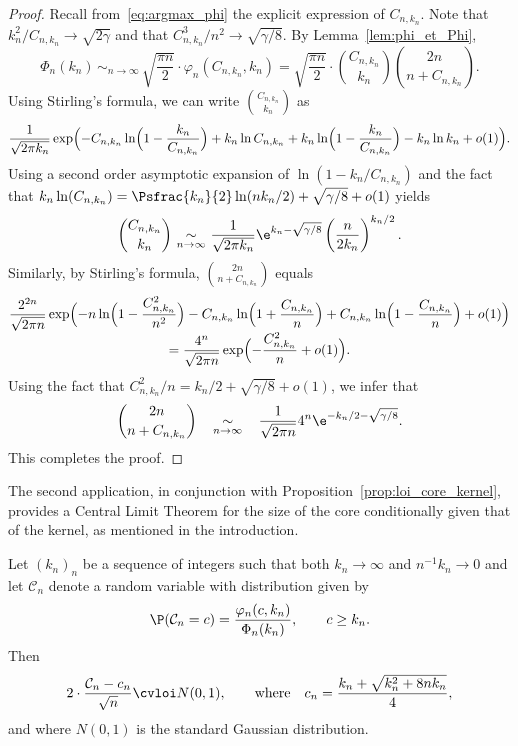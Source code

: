 \begin{proof}
Recall from~\eqref{eq:argmax_phi} the explicit expression of $C_{n,k_{n}}$. Note that $k_{n}^{2}/C_{n,k_{n}} \rightarrow \sqrt{2 \gamma}$ and that $C_{n,k_n}^{3}/n^{2} \rightarrow \sqrt{\gamma/8}$. By Lemma~\ref{lem:phi_et_Phi},\vspace*{-3pt}
\[
\Phi_{n}(k_{n}) \, \mathop{\sim}_{n \rightarrow \infty} \, \sqrt{ \frac{\pi n}{2}} \cdot \varphi_{n}(C_{n,k_n},k_n)= \sqrt{ \frac{\pi n}{2}} \cdot \binom{C_{n,k_{n}}}{k_{n}} \binom{2n}{n+C_{n,k_{n}}}.
\]
Using Stirling's formula, we can write $ \binom{C_{n,k_{n}}}{k_{n}}$ as\vspace*{-3pt}
\[
\frac{1}{\sqrt{2 \pi k_{n}}} \exp \Bigl(-C_{n,k_n} \ln \Bigl(1- \frac{k_{n}}{C_{n,k_n}}\Bigr)+ k_{n} \ln C_{n,k_n}+ k_{n} \ln \Bigl(1- \frac{k_{n}}{C_{n,k_n}}\Bigr)-k_{n} \ln k_{n} +o(1) \Bigr).
\]
Using a second order asymptotic expansion of $\ln(1-k_{n}/C_{n,k_n})$ and the fact that $k_{n }\ln(C_{n,k_{n}})= \Psfrac{k_{n}}{2} \ln(n k_{n}/2)+\sqrt{\gamma/8}+o(1)$ yields\vspace*{-3pt}
\[
\binom{C_{n,k_{n}}}{k_{n}} \, \mathop{\sim}_{n \rightarrow \infty} \, \frac{1}{\sqrt{2 \pi k_{n}}} \e^{k_{n}-\sqrt{\gamma/8}} \left(\frac{n}{2 k_{n}}\right)^{k_{n}/2}.
\]
Similarly, by Stirling's formula,
$\binom{2n}{n+C_{n,k_{n}}}$ equals\vspace*{-5pt}
\begin{multline*}
\frac{2^{2n}}{\sqrt{ 2 \pi n}} \exp \Bigl(-n \ln \Bigl(1- \frac{C_{n,k_n}^{2}}{n^{2}} \Bigr)-C_{n,k_n}\ln \Bigl(1+ \frac{C_{n,k_n}}{n} \Bigr) + C_{n,k_n}\ln \Bigl(1- \frac{C_{n,k_n}}{n}\Bigr)+o(1)\Bigr)
\\[-3pt]
= \frac{4^n}{\sqrt{ 2 \pi n}} \exp \Bigl(- \frac{C_{n,k_n}^{2}}{n}+o(1) \Bigr).
\end{multline*}
Using the fact that $C_{n,k_n}^{2}/n=k_{n}/2+ \sqrt{\gamma/8}+o(1)$, we infer that
\[
\binom{2n}{n+C_{n,k_{n}}} \quad \mathop{\sim}_{n \rightarrow \infty} \quad \frac{1}{\sqrt{ 2 \pi n}} 4^{n} \e^{-k_{n}/2-\sqrt{\gamma/8}}.
\]
This completes the proof.
\end{proof}

The second application, in conjunction with Proposition~\ref{prop:loi_core_kernel}, provides a Central Limit Theorem for the size of the core conditionally given that of the kernel, as mentioned in the introduction.

\begin{corollary}\label{cor:TCL_core}
Let $(k_n)_n$ be a sequence of integers such that both $k_n \to \infty$ and $n^{-1} k_n\to0$ and let $\mathcal{C}_{n}$ denote a random variable with distribution given by\vspace*{-3pt}
\[
\P(\mathcal{C}_{n}=c)= \frac{\varphi_{n}(c,k_{n})}{ \Phi_{n}(k_{n})}, \qquad c \geq k_{n}.
\]
Then\vspace*{-3pt}
\[
2 \cdot \frac{ \mathcal{C}_{n}-c_n}{ \sqrt{n}} \cvloi N(0,1),
\qquad\text{where}\quad
c_n = \frac{k_n + \sqrt{k_n^{2} + 8 n k_n }}{4} ,
\]
and where $N(0,1)$ is the standard Gaussian distribution.
\end{corollary}

